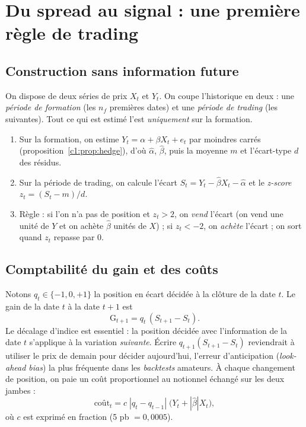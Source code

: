 \section{Du spread au signal : une première règle de trading}

\subsection{Construction sans information future}

On dispose de deux séries de prix $X_t$ et $Y_t$. On coupe l'historique en deux : une \emph{période de formation} (les $n_f$ premières dates) et une \emph{période de trading} (les suivantes). Tout ce qui est estimé l'est \emph{uniquement} sur la formation.
\begin{enumerate}
\item Sur la formation, on estime $Y_t = \alpha + \beta X_t + e_t$ par moindres carrés (proposition~\ref{c1:prop:hedge}), d'où $\hat\alpha$, $\hat\beta$, puis la moyenne $m$ et l'écart-type $d$ des résidus.
\item Sur la période de trading, on calcule l'écart $S_t = Y_t - \hat\beta X_t - \hat\alpha$ et le \emph{z-score} $z_t = (S_t - m)/d$.
\item Règle : si l'on n'a pas de position et $z_t > 2$, on \emph{vend} l'écart (on vend une unité de $Y$ et on achète $\hat\beta$ unités de $X$) ; si $z_t < -2$, on \emph{achète} l'écart ; on sort quand $z_t$ repasse par 0.
\end{enumerate}

\subsection{Comptabilité du gain et des coûts}

Notons $q_t \in \{-1, 0, +1\}$ la position en écart décidée à la clôture de la date $t$. Le gain de la date $t$ à la date $t+1$ est
\[
\text{G}_{t+1} = q_t\,(S_{t+1} - S_t).
\]
Le décalage d'indice est essentiel : la position décidée avec l'information de la date $t$ s'applique à la variation \emph{suivante}. Écrire $q_{t+1}(S_{t+1}-S_t)$ reviendrait à utiliser le prix de demain pour décider aujourd'hui, l'erreur d'anticipation (\emph{look-ahead bias}) la plus fréquente dans les \emph{backtests} amateurs. À chaque changement de position, on paie un coût proportionnel au notionnel échangé sur les deux jambes :
\[
\text{coût}_t = c\;|q_t - q_{t-1}|\;\big(Y_t + |\hat\beta|X_t\big),
\]
où $c$ est exprimé en fraction (5 pb $= 0{,}0005$).


